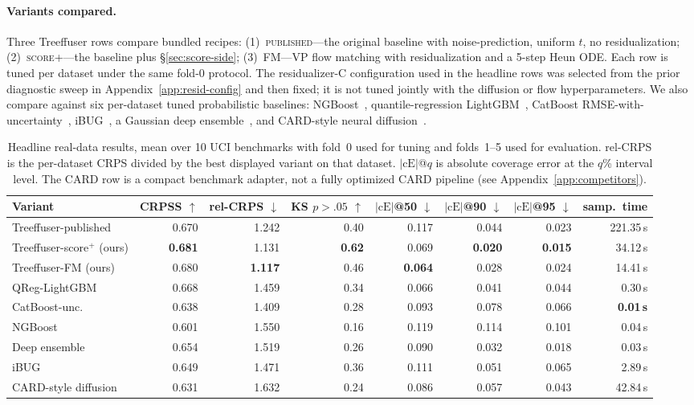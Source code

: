 \documentclass{tpm2026}
\begin{document}
\paragraph{Variants compared.} Three Treeffuser rows compare bundled recipes: (1)~\textsc{published}---the original baseline with noise-prediction, uniform $t$, no residualization; (2)~\textsc{score+}---the baseline plus \S\ref{sec:score-side}; (3)~\textsc{FM}---VP flow matching with residualization and a 5-step Heun ODE. Each row is tuned per dataset under the same fold-0 protocol. The residualizer-C configuration used in the headline rows was selected from the prior diagnostic sweep in Appendix~\ref{app:resid-config} and then fixed; it is not tuned jointly with the diffusion or flow hyperparameters. We also compare against six per-dataset tuned probabilistic baselines: NGBoost~\citep{duan2020ngboost}, quantile-regression LightGBM~\citep{ke2017lightgbm}, CatBoost RMSE-with-uncertainty~\citep{prokhorenkova2018catboost}, iBUG~\citep{brophy2022ibug}, a Gaussian deep ensemble~\citep{lakshminarayanan2017deep}, and CARD-style neural diffusion~\citep{han2022card}.

\begin{table}[!t]
  \centering
  \caption{Headline real-data results, mean over 10 UCI benchmarks with fold~0 used for tuning and folds~1--5 used for evaluation. rel-CRPS is the per-dataset CRPS divided by the best displayed variant on that dataset. $|\text{cE}|$@$q$ is absolute coverage error at the $q$\% interval level. The CARD row is a compact benchmark adapter, not a fully optimized CARD pipeline (see Appendix~\ref{app:competitors}).}\label{tab:headline}
  \scriptsize
  \begin{tabular}{lrrrrrrr}
    \toprule
    Variant & CRPSS $\uparrow$ & rel-CRPS $\downarrow$ & KS $p{>}.05$ $\uparrow$ & $|\text{cE}|$@50 $\downarrow$ & $|\text{cE}|$@90 $\downarrow$ & $|\text{cE}|$@95 $\downarrow$ & samp.\ time \\
    \midrule
    Treeffuser-published & 0.670 & 1.242 & 0.40 & 0.117 & 0.044 & 0.023 & 221.35\,s \\
    Treeffuser-score$^+$ (ours) & \textbf{0.681} & 1.131 & \textbf{0.62} & 0.069 & \textbf{0.020} & \textbf{0.015} & 34.12\,s \\
    Treeffuser-FM (ours) & 0.680 & \textbf{1.117} & 0.46 & \textbf{0.064} & 0.028 & 0.024 & 14.41\,s \\
    \midrule
    QReg-LightGBM & 0.668 & 1.459 & 0.34 & 0.066 & 0.041 & 0.044 & 0.30\,s \\
    CatBoost-unc. & 0.638 & 1.409 & 0.28 & 0.093 & 0.078 & 0.066 & \textbf{0.01\,s} \\
    NGBoost & 0.601 & 1.550 & 0.16 & 0.119 & 0.114 & 0.101 & 0.04\,s \\
    Deep ensemble & 0.654 & 1.519 & 0.26 & 0.090 & 0.032 & 0.018 & 0.03\,s \\
    iBUG & 0.649 & 1.471 & 0.36 & 0.111 & 0.051 & 0.065 & 2.89\,s \\
    CARD-style diffusion & 0.631 & 1.632 & 0.24 & 0.086 & 0.057 & 0.043 & 42.84\,s \\
    \bottomrule
  \end{tabular}
\end{table}
\end{document}
